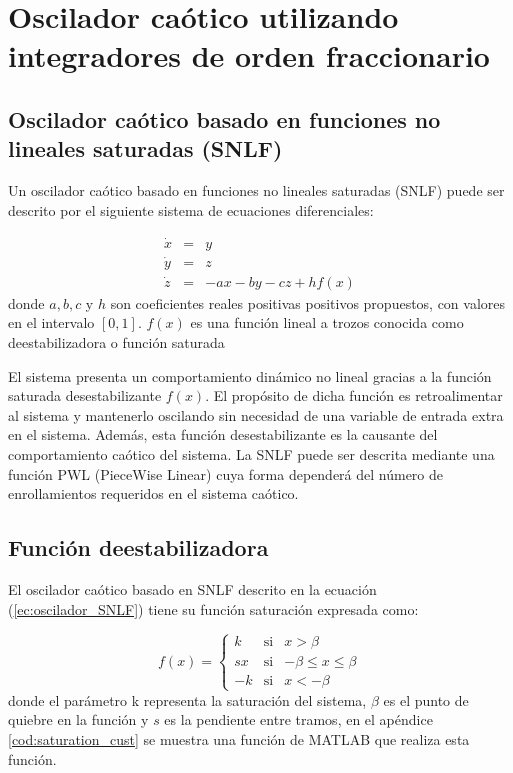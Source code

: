 \chapter{Oscilador caótico utilizando integradores de orden fraccionario}

	\section{Oscilador caótico basado en funciones no lineales saturadas (SNLF)}
	
	Un oscilador caótico basado en funciones no lineales saturadas (SNLF) puede ser descrito por el siguiente sistema de ecuaciones diferenciales:

	\begin{equation} 
		\begin{array}{lcl}
		\dot{x} & = & y \\
		\dot{y} & = & z\\
		\dot{z} & = & -ax - by -cz + hf(x)
		\end{array}
		\label{ec:oscilador_SNLF}
	\end{equation}
	donde  $a, b, c$ y $h$ son coeficientes reales positivas positivos propuestos, con valores en el intervalo $[0, 1]$. $f(x)$ es una función lineal a trozos conocida como deestabilizadora o función saturada
	 
	 El sistema presenta un comportamiento dinámico no lineal gracias a la función saturada desestabilizante $f(x)$. El propósito de dicha función es retroalimentar al sistema y mantenerlo oscilando sin necesidad de una variable de entrada extra en el sistema. Además, esta función desestabilizante es la causante del comportamiento caótico del sistema. La SNLF puede ser descrita mediante una función PWL (PieceWise Linear) cuya forma dependerá del número de enrollamientos requeridos en el sistema caótico.
		
		\section{Función deestabilizadora}
	 El oscilador caótico basado en SNLF descrito en la ecuación (\ref{ec:oscilador_SNLF}) tiene su función saturación expresada como:
	 
	 \begin{equation}
		f(x) = \left\{ \begin{array}{lcl}
		k & \mathrm{si} & x > \beta \\
		sx & \mathrm{si} & - \beta \leq x \leq \beta  \\
		-k & \mathrm{si} & x < -\beta
		\end{array}
		\right.
		\label{ec:saturacion}
	\end{equation}
	donde el parámetro k representa la saturación del sistema, $\beta$ es el punto de quiebre en la función y $s$ es la pendiente entre tramos, en el apéndice \ref{cod:saturation_cust} se muestra una función de MATLAB que realiza esta función. 
	
